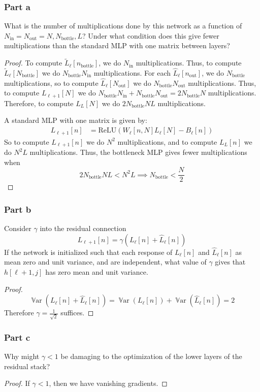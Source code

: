 \documentclass{amsart}
\DeclareMathOperator{\Var}{\mathbb{V}ar}  %
\theoremstyle{definition}
\begin{document}
\subsubsection*{Part a} What is the number of multiplications done by this network as a function of $N_{\text{in}} = N_{\text{out}} = N, N_{\text{bottle}}, L$?
Under what condition does this give fewer multiplications than the standard MLP with one matrix between layers?
\begin{proof}
  To compute $\tilde{L}_\ell[n_{\text{bottle}}]$, we do $N_{\text{in}}$ multiplications. 
  Thus, to compute $\tilde{L}_\ell[N_{\text{bottle}}]$ we do $N_{\text{bottle}} N_{\text{in}}$ multiplications.
  For each $\hat{L}_\ell[n_{\text{out}}]$, we do $N_{\text{bottle}}$ multiplications, so to compute $\hat{L}_\ell[N_{\text{out}}]$ we do $N_{\text{bottle}} N_{\text{out}}$ multiplications.
  Thus, to compute $L_{\ell + 1}[N]$ we do $N_{\text{bottle}} N_{\text{in}} + N_{\text{bottle}} N_{\text{out}} = 2 N_{\text{bottle}} N$ multiplications.
  Therefore, to compute $L_{L}[N]$ we do $2 N_{\text{bottle}} N L$ multiplications.

  A standard MLP with one matrix is given by:
  \begin{align*}
    L_{\ell + 1}[n] &= \mathrm{ReLU}(W_\ell[n, N] L_\ell[N] - B_\ell[n]) 
  \end{align*}
  So to compute $L_{\ell + 1}[n]$ we do $N^2$ multiplications, and to compute $L_L[n]$ we do $N^2 L$ multiplications.
  Thus, the bottleneck MLP gives fewer multiplications when 
  \[
  2 N_{\text{bottle}} N L < N^2 L \implies N_{\text{bottle}} < \frac{N}{2}
  \]
\end{proof}

\subsubsection*{Part b} Consider $\gamma$ into the residual connection
\[
L_{\ell + 1}[n] = \gamma(L_{\ell}[n] + \hat{L}_{\ell}[n])
\]
If the network is initialized such that each response of $L_{\ell}[n]$ and $\hat{L}_{\ell}[n]$ as mean zero and unit variance, and are independent, what value of $\gamma$ gives that $h[\ell + 1, j]$ has zero mean and unit variance. 

\begin{proof}
  \[
  \Var(L_{\ell}[n] + \hat{L}_{\ell}[n]) = \Var(L_{\ell}[n]) + \Var(\hat{L}_\ell[n]) = 2
  \]
  Therefore $\gamma = \frac1{\sqrt{2}}$ suffices. 
\end{proof}

\subsubsection*{Part c}
Why might $\gamma < 1$ be damaging to the optimization of the lower layers of the residual stack?
\begin{proof}
  If $\gamma < 1$, then we have vanishing gradients.
\end{proof}
\end{document}
